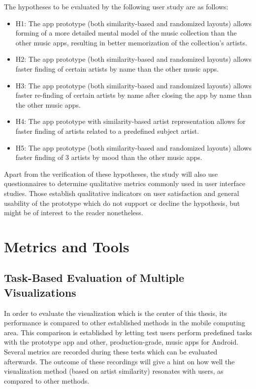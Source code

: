 The hypotheses to be evaluated by the following user study are as follows:

\begin{itemize}
	\item H1: The app prototype (both similarity-based and randomized layouts) allows forming of a more detailed mental model of the music collection than the other music apps, resulting in better memorization of the collection's artists.
	\item H2: The app prototype (both similarity-based and randomized layouts) allows faster finding of certain artists by name than the other music apps.
	\item H3: The app prototype (both similarity-based and randomized layouts) allows faster re-finding of certain artists by name after closing the app by name than the other music apps.
	\item H4: The app prototype with similarity-based artist representation allows for faster finding of artists related to a predefined subject artist.
	\item H5: The app prototype (both similarity-based and randomized layouts) allows faster finding of 3 artists by mood than the other music apps.
\end{itemize}

Apart from the verification of these hypotheses, the study will also use questionnaires to determine qualitative metrics commonly used in user interface studies. Those establish qualitative indicators on user satisfaction and general usability of the prototype which do not support or decline the hypothesis, but might be of interest to the reader nonetheless.

\section{Metrics and Tools}

\subsection{Task-Based Evaluation of Multiple Visualizations}

In order to evaluate the visualization which is the center of this thesis, its performance is compared to other established methods in the mobile computing area. This comparison is established by letting test users perform predefined tasks with the prototype app and other, production-grade, music apps for Android. Several metrics are recorded during these tests which can be evaluated afterwards. The outcome of these recordings will give a hint on how well the visualization method (based on artist similarity) resonates with users, as compared to other methods.

